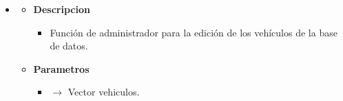 \begin{itemize}
\begin{itemize}
\begin{itemize}
         	\end{itemize}
	\end{itemize}
    \item{}
	\begin{itemize}
		\item \textbf{Descripcion}
        \begin{itemize}
			\item Función de administrador para la edición de los vehículos de la base de datos.
		\end{itemize}
        \item \textbf{Parametros}
		\begin{itemize}
			\item {} $\rightarrow$ Vector vehiculos.
         	\end{itemize}
	\end{itemize}

\end{itemize}
\newpage

